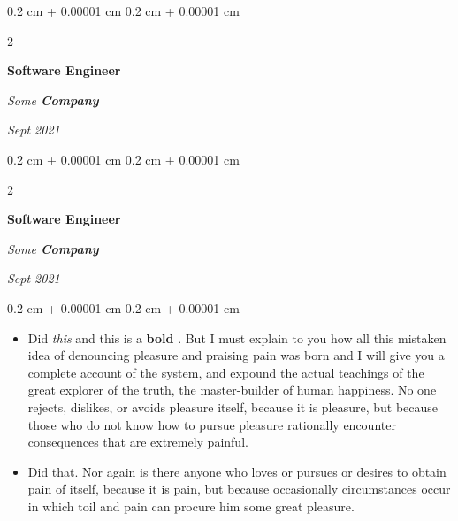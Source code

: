 \documentclass[10pt, letterpaper]{article}
\newenvironment{highlights}{
    \begin{itemize}[
        topsep=0.10 cm,
        parsep=0.10 cm,
        partopsep=0pt,
        itemsep=0pt,
        leftmargin=0.4 cm + 10pt
    ]
}{
    \end{itemize}
} %
\newenvironment{onecolentry}{
    \begin{adjustwidth}{
        0.2 cm + 0.00001 cm
    }{
        0.2 cm + 0.00001 cm
    }
}{
    \end{adjustwidth}
} %
\newenvironment{twocolentry}[2][]{
    \onecolentry
    \def\secondColumn{#2}
    \setcolumnwidth{\fill, 4.5 cm}
    \begin{paracol}{2}
}{
    \switchcolumn \raggedleft \secondColumn
    \end{paracol}
    \endonecolentry
} %
\let\hrefWithoutArrow\href
\renewcommand{\href}[2]{\hrefWithoutArrow{#1}{\ifthenelse{\equal{#2}{}}{ }{#2 }\raisebox{.15ex}{\footnotesize \faExternalLink*}}}
\begin{document}
        \vspace{0.2 cm}

            \begin{twocolentry}{


        \textit{Sept 2021}    }
                \textbf{Software Engineer}

                \textit{Some \textbf{Company}}
            \end{twocolentry}



        \vspace{0.2 cm}

            \begin{twocolentry}{


        \textit{Sept 2021}    }
                \textbf{Software Engineer}

                \textit{Some \textbf{Company}}
            \end{twocolentry}

        \vspace{0.10 cm}
        \begin{onecolentry}
            \begin{highlights}
                \item Did \textit{this} and this is a \textbf{bold} \href{https://example.com}{link}. But I must explain to you how all this mistaken idea of denouncing pleasure and praising pain was born and I will give you a complete account of the system, and expound the actual teachings of the great explorer of the truth, the master-builder of human happiness. No one rejects, dislikes, or avoids pleasure itself, because it is pleasure, but because those who do not know how to pursue pleasure rationally encounter consequences that are extremely painful.
                \item Did that. Nor again is there anyone who loves or pursues or desires to obtain pain of itself, because it is pain, but because occasionally circumstances occur in which toil and pain can procure him some great pleasure.
            \end{highlights}
        \end{onecolentry}
\end{document}
